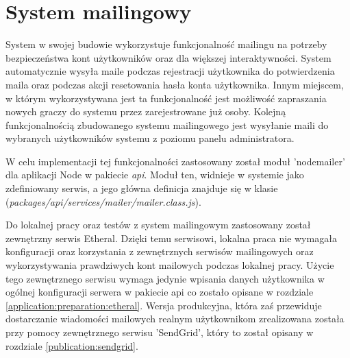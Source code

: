 \label{section:mailling}
\section{System mailingowy}
System w swojej budowie wykorzystuje funkcjonalność mailingu na potrzeby bezpieczeństwa kont użytkowników oraz dla większej interaktywności. System automatycznie wysyła maile podczas rejestracji użytkownika do potwierdzenia maila oraz podczas akcji resetowania hasła konta użytkownika. Innym miejscem, w którym wykorzystywana jest ta funkcjonalność jest możliwość zapraszania nowych graczy do systemu przez zarejestrowane już osoby. Kolejną funkcjonalnością zbudowanego systemu mailingowego jest wysyłanie maili do wybranych użytkowników systemu z poziomu panelu administratora.

W celu implementacji tej funkcjonalności zastosowany został moduł 'nodemailer' dla aplikacji Node w pakiecie \textit{api}. Moduł ten, widnieje w systemie jako zdefiniowany serwis, a jego główna definicja znajduje się w klasie (\textit{packages/api/services/mailer/mailer.class.js}).

Do lokalnej pracy oraz testów z system mailingowym zastosowany został zewnętrzny serwis Etheral. Dzięki temu serwisowi, lokalna praca nie wymagała konfiguracji oraz korzystania z zewnętrznych serwisów mailingowych oraz wykorzystywania prawdziwych kont mailowych podczas lokalnej pracy. Użycie tego zewnętrznego serwisu wymaga jedynie wpisania danych użytkownika w ogólnej konfiguracji serwera w pakiecie api co zostało opisane w rozdziale \ref{application:preparation:etheral}. Wersja produkcyjna, która zaś przewiduje dostarczanie wiadomości mailowych realnym użytkownikom zrealizowana została przy pomocy zewnętrznego serwisu 'SendGrid', który to został opisany w rozdziale \ref{publication:sendgrid}.
